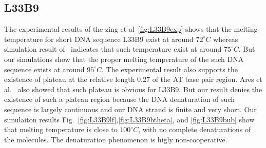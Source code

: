 \documentclass[12pt,masters,final]{UTRGVthesis}
\begin{document}
\subsection{L33B9}
The experimental results of the zing et al~\cite{zeng2003length,zeng2004bubble}\ref{fig:L33B9exp} shows that the melting temperature for short DNA sequence L33B9  exist at around $72^\circ C$ whereas simulation result of~\cite{ares2005bubble} indicates that such temperature exist at around $75^\circ C$. But our simulations show that the proper melting temperature of the such DNA sequence exists at around $95^\circ C$. The experimental result also supports the existence of plateau at the relative length 0.27 of the AT base pair region. Ares et al.~\cite{ares2005bubble} also showed that such plateau is obvious for L33B9. But our result denies the existence of such a plateau region because the DNA denaturation of such sequence is largely continuous and our DNA strand is finite and very short. Our simulaiton results Fig.~\ref{fig:L33B9lf},\ref{fig:L33B9htheta}, and \ref{fig:L33B9bub} show that melting temperature is close to $100^\circ C$, with no complete denaturations of the molecules. The denaturation phenomenon is higly non-cooperative.
\newpage
%
\end{document}
